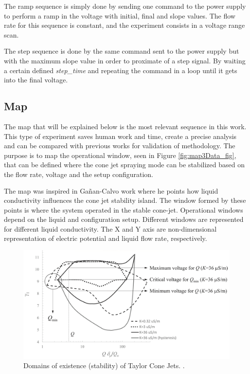 The ramp sequence is simply done by sending one command to the power supply to perform a ramp in the voltage with initial, final and slope values.
The flow rate for this sequence is constant, and the experiment consists in a voltage range scan.

The step sequence is done by the same command sent to the power supply but with the maximum slope value in order to proximate of a step signal.
By waiting a certain defined \emph{step\_time} and repeating the command in a loop until it gets into the final voltage.


\subsection{Map}

The map that will be explained below is the most relevant sequence in this work. This type of experiment saves human work and time, create a precise analysis and can be compared with previous works for validation of methodology.
The purpose is to map the operational window, seen in Figure \ref{fig:map3Data_fig}, that can be defined where the cone jet spraying mode can be stabilized based on the flow rate, voltage and the setup configuration.

The map was inspired in Gañan-Calvo\cite{gananCalvo} work where he points how liquid conductivity influences the cone jet stability island. 
The window formed by these points is where the system operated in the stable cone-jet. Operational windows depend on the liquid and configuration setup. Different windows are represented for different liquid conductivity. The X and Y axis are non-dimensional representation of electric potential and liquid flow rate, respectively.

\begin{figure}[H]
    \center
    \includegraphics[width=15cm]{Figuras/ganan_calvo_map.png}
    \caption{Domains of existence (stability) of Taylor Cone Jets. \cite{gananCalvo} .}
    \label{fig:ganan_calvo_fig}
\end{figure}

